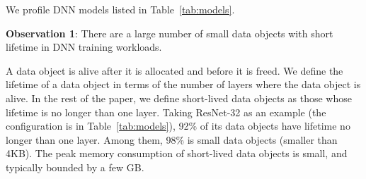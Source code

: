 \textcolor{check}{We profile DNN models listed in Table~\ref{tab:models}.}

\textbf{Observation 1}: There are a large number of small data objects with short lifetime in DNN training workloads.

\textcolor{check}{
A data object is alive after it is allocated and before it is freed. We define the lifetime of a data object in terms of the number of layers where the data object is alive. In the rest of the paper, we define short-lived data objects as those whose lifetime is no longer than one layer. Taking ResNet-32 as an example (the configuration is in Table~\ref{tab:models}), 92\% of its data objects have lifetime no longer than one layer. Among them, 98\% is small data objects (smaller than 4KB). The peak memory consumption of short-lived data objects is small, and typically bounded by a few GB.}



